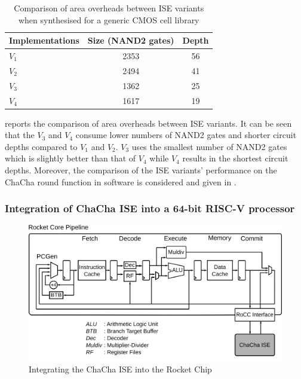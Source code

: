 \begin{table}
	\caption{Comparison of area overheads between ISE variants when synthesised for a
		generic CMOS cell library}
	\label{tab:res:hardcost1}
	\begin{tabular}{lcc}
		\toprule            
		Implementations        & Size (NAND2 gates)    & Depth  \\
		
		\midrule
		$V_1$ &     2353     & 56   \\
		$V_2$ &     2494     & 41   \\
		$V_3$ &     1362     & 25   \\
		$V_4$ &     1617     & 19   \\
		
		\bottomrule
	\end{tabular}
\end{table}

 reports the comparison of area overheads between ISE variants. It can be seen that the $V_3$ and $V_4$ consume lower numbers of NAND2 gates and shorter circuit depths compared to $V_1$ and $V_2$. $V_3$ uses the smallest number of NAND2 gates which is slightly better than that of $V_4$ while $V_4$ results in the shortest circuit depths. Moreover, the comparison of the ISE variants' performance on the ChaCha round function in software is considered and given in .

\subsubsection{Integration of ChaCha ISE into a 64-bit RISC-V processor}
\label{sec:ise:hw:sys}

\begin{figure}
	\centering
	\includegraphics[scale=0.8]{figures/RocketCoreRoCC.png}
	\caption{Integrating the ChaCha ISE into the Rocket Chip}
	\label{fig:ise:RocketCoreRoCC}
\end{figure}

